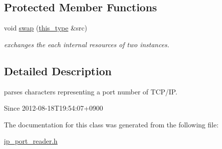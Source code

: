 \subsection*{Protected Member Functions}
\begin{DoxyCompactItemize}
\item 
\hypertarget{classhryky_1_1ip_1_1port_1_1_reader_abc4e0ea972e2ae38ca85a89a3542e998}{void \hyperlink{classhryky_1_1ip_1_1port_1_1_reader_abc4e0ea972e2ae38ca85a89a3542e998}{swap} (\hyperlink{classhryky_1_1ip_1_1port_1_1_reader_a5ed0fa6cde14d55890bca881ddacbd24}{this\-\_\-type} \&src)}\label{classhryky_1_1ip_1_1port_1_1_reader_abc4e0ea972e2ae38ca85a89a3542e998}

\begin{DoxyCompactList}\small\item\em exchanges the each internal resources of two instances. \end{DoxyCompactList}\end{DoxyCompactItemize}


\subsection{Detailed Description}
parses characters representing a port number of T\-C\-P/\-I\-P. 

\begin{DoxySince}{Since}
2012-\/08-\/18\-T19\-:54\-:07+0900 
\end{DoxySince}


The documentation for this class was generated from the following file\-:\begin{DoxyCompactItemize}
\item 
\hyperlink{ip__port__reader_8h}{ip\-\_\-port\-\_\-reader.\-h}\end{DoxyCompactItemize}

